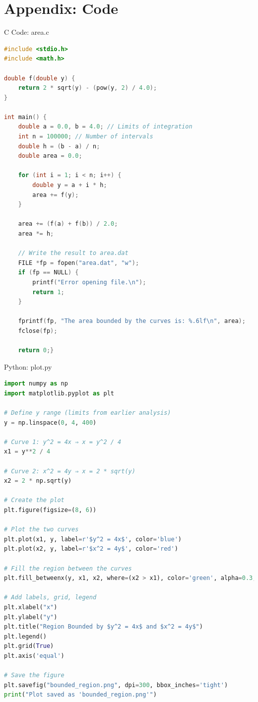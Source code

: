 \documentclass{beamer}
\numberwithin{equation}{section}
\theoremstyle{remark}
\begin{document}
\section*{Appendix: Code}

\begin{frame}[fragile]{C Code: area.c}
\begin{lstlisting}[language=C]
#include <stdio.h>
#include <math.h>

double f(double y) {
    return 2 * sqrt(y) - (pow(y, 2) / 4.0);
}

int main() {
    double a = 0.0, b = 4.0; // Limits of integration
    int n = 100000; // Number of intervals
    double h = (b - a) / n;
    double area = 0.0;

    for (int i = 1; i < n; i++) {
        double y = a + i * h;
        area += f(y);
    }

    area += (f(a) + f(b)) / 2.0;
    area *= h;

    // Write the result to area.dat
    FILE *fp = fopen("area.dat", "w");
    if (fp == NULL) {
        printf("Error opening file.\n");
        return 1;
    }

    fprintf(fp, "The area bounded by the curves is: %.6lf\n", area);
    fclose(fp);

    return 0;}

\end{lstlisting}
\end{frame}

\begin{frame}[fragile]{Python: plot.py}
\begin{lstlisting}[language=Python]
import numpy as np
import matplotlib.pyplot as plt

# Define y range (limits from earlier analysis)
y = np.linspace(0, 4, 400)

# Curve 1: y^2 = 4x ⇒ x = y^2 / 4
x1 = y**2 / 4

# Curve 2: x^2 = 4y ⇒ x = 2 * sqrt(y)
x2 = 2 * np.sqrt(y)

# Create the plot
plt.figure(figsize=(8, 6))

# Plot the two curves
plt.plot(x1, y, label=r'$y^2 = 4x$', color='blue')
plt.plot(x2, y, label=r'$x^2 = 4y$', color='red')

# Fill the region between the curves
plt.fill_betweenx(y, x1, x2, where=(x2 > x1), color='green', alpha=0.3, label='Bounded Area')

# Add labels, grid, legend
plt.xlabel("x")
plt.ylabel("y")
plt.title("Region Bounded by $y^2 = 4x$ and $x^2 = 4y$")
plt.legend()
plt.grid(True)
plt.axis('equal')

# Save the figure
plt.savefig("bounded_region.png", dpi=300, bbox_inches='tight')
print("Plot saved as 'bounded_region.png'")

\end{lstlisting}
\end{frame}
\end{document}
